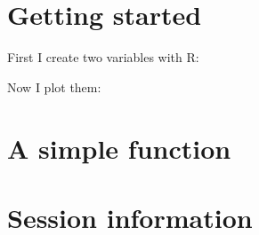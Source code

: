 \documentclass{article}
\begin{document}
\thispagestyle{fancy}

\section{Getting started}

First I create two variables with R:


Now I plot them:


\section{A simple function}


\section{Session information}

\end{document}
